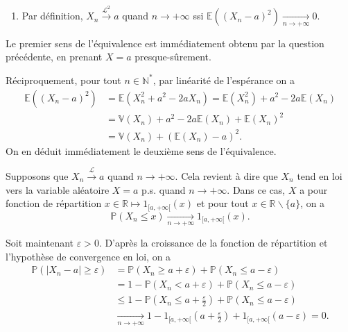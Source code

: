 \begin{enumerate}
\def\labelenumi{\arabic{enumi}.}
\setcounter{enumi}{1}
\tightlist
\item
  Par définition, \(X_n \overset{\mathcal{L}^2}{\longrightarrow} a\)
  quand \(n\to+\infty\) ssi
  \(\mathbb{E}\left(\left(X_n - a\right)^2\right) \xrightarrow[n\to+\infty]{} 0\).
\end{enumerate}

Le premier sens de l'équivalence est immédiatement obtenu par la
question précédente, en prenant \(X = a\) presque-sûrement.

Réciproquement, pour tout \(n\in\mathbb{N}^\ast\), par linéarité de
l'espérance on a \begin{align*}
\mathbb{E}\left( \left(X_n-a\right)^2 \right) &= \mathbb{E}\left( X_n^2 + a^2 - 2aX_n \right) = \mathbb{E}\left(X_n^2\right) + a^2 - 2a\mathbb{E}\left(X_n\right)\\
&= \mathbb{V}\left(X_n\right) + a^2 - 2a\mathbb{E}\left(X_n\right) + \mathbb{E}\left(X_n\right)^2\\
&= \mathbb{V}\left(X_n\right) + \left(\mathbb{E}(X_n) - a\right)^2.
\end{align*} On en déduit immédiatement le deuxième sens de
l'équivalence.

\label{IV-answer-cvtocst-loiprob}
Supposons que \(X_n \overset{\mathcal{L}}{\longrightarrow} a\) quand
\(n\to+\infty\). Cela revient à dire que \(X_n\) tend en loi vers la
variable aléatoire \(X = a\) p.s. quand \(n\to+\infty\). Dans ce cas,
\(X\) a pour fonction de répartition
\(x\in\mathbb{R}\mapsto 1_{[a,+\infty[}(x)\) et pour tout
\(x \in \mathbb{R}\backslash\{a\}\), on a
\[\mathbb{P}\left(X_n \leq x \right) \xrightarrow[n\to+\infty]{} 1_{[a,+\infty[}(x).\]

Soit maintenant \(\varepsilon > 0\). D'après la croissance de la
fonction de répartition et l'hypothèse de convergence en loi, on a
\begin{align*}
\mathbb{P}\left(\left|X_n - a\right| \geq \varepsilon \right) &= \mathbb{P}\left(X_n \geq a + \varepsilon \right) + \mathbb{P}\left(X_n \leq a - \varepsilon \right)\\
&= 1 - \mathbb{P}\left(X_n < a + \varepsilon \right) + \mathbb{P}\left(X_n \leq a - \varepsilon \right)\\
&\leq 1 - \mathbb{P}\left(X_n \leq a + \frac{\varepsilon}{2} \right) + \mathbb{P}\left(X_n \leq a - \varepsilon \right)\\
& \xrightarrow[n\to+\infty]{} 1 - 1_{[a,+\infty[}\left(a+\frac{\varepsilon}{2}\right) + 1_{[a,+\infty[}\left(a-\varepsilon\right) = 0.
\end{align*}

